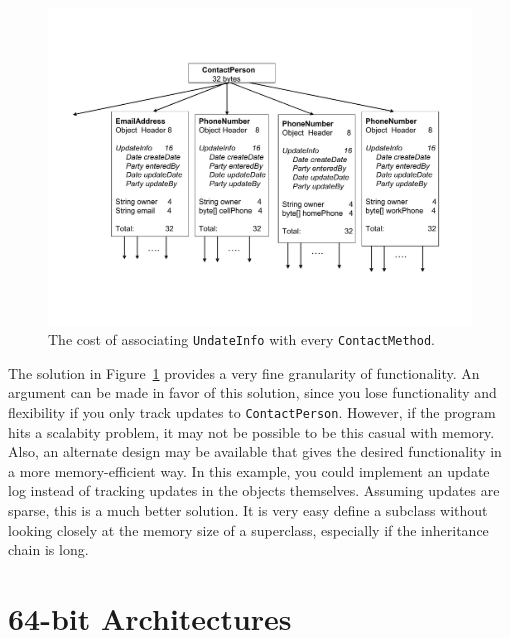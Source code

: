 \begin{figure}
  \centering
 \includegraphics[width=.70\textwidth]{Figures/chapter4/big-base-class.pdf}
  \caption{The cost of associating \texttt{UndateInfo} with every \texttt{ContactMethod}.}
  \label{fig:big-base-class}
\end{figure}
 
The solution in Figure~\ref{fig:big-base-class} provides a very fine granularity of functionality. An argument can be made in favor of this solution, since you lose functionality and flexibility if you only track updates to \texttt{ContactPerson}. However, if the program hits a scalabity problem, it may not be possible to be this casual with memory. Also, an alternate design may be available that gives the desired functionality in a more memory-efficient way. In this example, you could implement an update log instead of tracking updates in the objects themselves. Assuming updates are sparse, this is a much better solution. It is very easy define a subclass without looking closely at the memory size of a superclass, especially if the inheritance chain is long.   

\section{64-bit Architectures}

